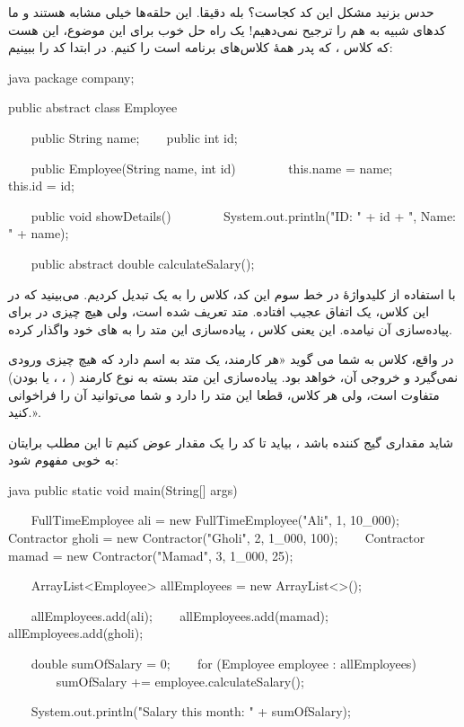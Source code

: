 حدس بزنید مشکل این کد کجاست؟ بله دقیقا. این حلقه‌ها خیلی مشابه هستند و ما
کدهای شبیه به هم را ترجیح نمی‌دهیم! یک راه حل خوب برای این موضوع، این هست
که کلاس  ، که پدر همهٔ کلاس‌های برنامه‌ است را
 کنیم. در ابتدا کد را ببینیم:

\begin{codebox}{java}
package company;

public abstract class Employee {
    public String name;
    public int id;

    public Employee(String name, int id) {
        this.name = name;
        this.id = id;  
    }

    public void showDetails() {  
        System.out.println("ID: " + id + ", Name: " + name);  
    }

    public abstract double calculateSalary();  
}
\end{codebox}

با استفاده از کلیدواژهٔ  در خط سوم این کد، کلاس
 را به یک  تبدیل کردیم. می‌بینید
که در این کلاس، یک اتفاق عجیب افتاده. متد
 تعریف شده است، ولی هیچ چیزی در
\lr{\texttt{\{\}}} برای پیاده‌سازی آن نیامده. این یعنی کلاس
 ، پیاده‌سازی این متد را به  های خود
واگذار کرده.

در واقع، کلاس  به شما می گوید «هر کارمند، یک متد
به اسم  دارد که هیچ چیزی ورودی نمی‌گیرد و
خروجی آن،  خواهد بود. پیاده‌سازی این متد بسته به نوع
کارمند ( ،  ،
 یا  بودن) متفاوت است، ولی
هر کلاس، قطعا این متد را دارد و شما می‌توانید آن را فراخوانی کنید.».

شاید مقداری گیج کننده باشد ، بیاید تا کد  را یک مقدار
عوض کنیم تا این مطلب برایتان به خوبی مفهوم شود:

\begin{codebox}{java}
public static void main(String[] args) {  
    FullTimeEmployee ali = new FullTimeEmployee("Ali", 1, 10_000);  
    Contractor gholi = new Contractor("Gholi", 2, 1_000, 100);  
    Contractor mamad = new Contractor("Mamad", 3, 1_000, 25);  
  
    ArrayList<Employee> allEmployees = new ArrayList<>();  
  
    allEmployees.add(ali);  
    allEmployees.add(mamad);  
    allEmployees.add(gholi);

    double sumOfSalary = 0;
    for (Employee employee : allEmployees) {  
        sumOfSalary += employee.calculateSalary();  
    }  
  
    System.out.println("Salary this month: " + sumOfSalary);  
}
\end{codebox}

